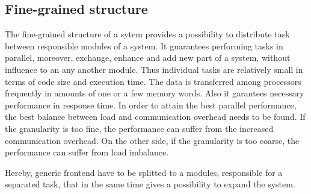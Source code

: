 \subsection {Fine-grained structure}
The fine-grained structure of a sytem provides a possibility to distribute task between responsible modules of a system. It guarantees performing tasks in parallel, moreover, exchange, enhance and add new part of a system, without influence to an any another module. Thus individual tasks are relatively small in terms of code size and execution time. The data is transferred among processors frequently in amounts of one or a few memory words. Also it garantees necessary performance in response time. In order to attain the best parallel performance, the best balance between load and communication overhead needs to be found. If the granularity is too fine, the performance can suffer from the increased communication overhead. On the other side, if the granularity is too coarse, the performance can suffer from load imbalance.

Hereby, generic frontend have to be splitted to a modules, responsible for a separated task, that in the same time gives a possibility to expand the system.

